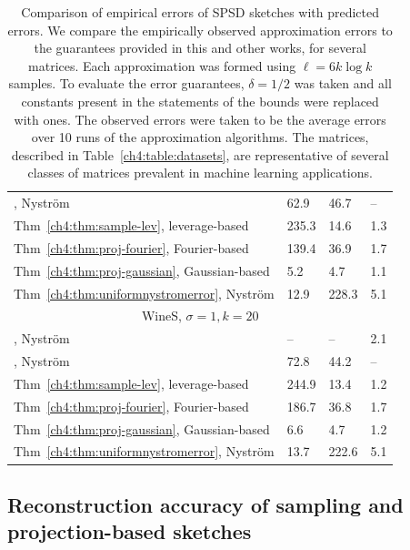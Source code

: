 \begin{table}[!htb]
\begin{tabular}{|l|p{1in}|p{1in}|p{1in}|}
\cite{KMT12}, Nystr\"om
 & 62.9
 & 46.7
 & -- \\
Thm~\ref{ch4:thm:sample-lev},  leverage-based
 & 235.3
 & 14.6
 & 1.3 \\
Thm~\ref{ch4:thm:proj-fourier}, Fourier-based
 & 139.4
 & 36.9
 & 1.7\\
Thm~\ref{ch4:thm:proj-gaussian}, Gaussian-based
 & 5.2
 & 4.7
 & 1.1\\
Thm~\ref{ch4:thm:uniformnystromerror}, Nystr\"om
 & 12.9
 & 228.3
 & 5.1\\
 \hline
 \multicolumn{4}{|c|}{WineS, $\sigma = 1, k = 20$ }\\
 \hline
\cite{BW09}, Nystr\"om
 & --  
 & --  
 & 2.1\\
\cite{KMT12}, Nystr\"om
 & 72.8
 & 44.2
 & -- \\
Thm~\ref{ch4:thm:sample-lev},  leverage-based
 & 244.9
 & 13.4
 & 1.2\\
Thm~\ref{ch4:thm:proj-fourier}, Fourier-based
 & 186.7
 & 36.8
 & 1.7\\
Thm~\ref{ch4:thm:proj-gaussian}, Gaussian-based
 & 6.6
 & 4.7
 & 1.2\\
Thm~\ref{ch4:thm:uniformnystromerror}, Nystr\"om
 & 13.7
 & 222.6
 & 5.1\\
 \hline
\end{tabular}
\caption[Comparison of empirical errors of SPSD sketches with predicted errors]{
{\sc Comparison of empirical errors of SPSD sketches with predicted errors.}
We compare the empirically observed approximation errors to the guarantees provided in this and other works, for several
matrices. Each approximation was formed using $\ell = 6 k\log k$ samples. To evaluate the error guarantees,
$\delta = 1/2$ was taken and all constants present in the statements of the bounds were replaced with ones. The observed errors were
taken to be the average errors over 10 runs of the approximation algorithms.
The matrices, described in Table~\ref{ch4:table:datasets}, are representative of several classes of matrices prevalent
in machine learning applications.}
\label{ch4:table:theory-practice-gap}
\end{table}


\subsection{Reconstruction accuracy of sampling and projection-based sketches}
\label{ch4:sxn:emp-reconstruction}


